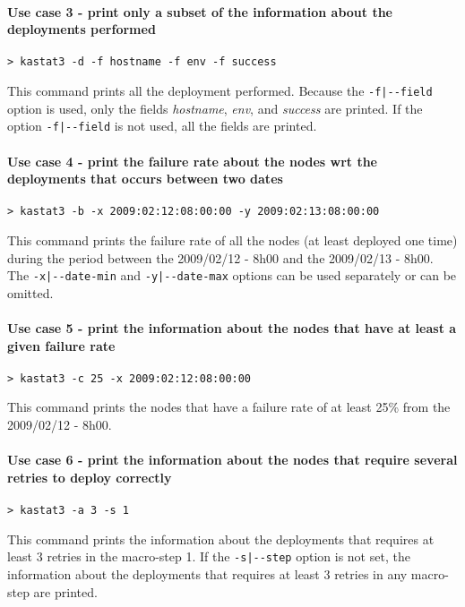 \documentclass[a4wide,10pt,oneside]{book}
\begin{document}
\paragraph{Use case 3 - print only a subset of the information about the deployments performed}
\begin{verbatim}
> kastat3 -d -f hostname -f env -f success
\end{verbatim}
This command prints all the deployment performed. Because the \texttt{-f|-{}-field} option is used, only the fields \textit{hostname}, \textit{env}, and \textit{success} are printed. If the option \texttt{-f|-{}-field} is not used, all the fields are printed.

\paragraph{Use case 4 - print the failure rate about the nodes wrt the deployments that occurs between two dates}
\begin{verbatim}
> kastat3 -b -x 2009:02:12:08:00:00 -y 2009:02:13:08:00:00
\end{verbatim}
This command prints the failure rate of all the nodes (at least deployed one time) during the period between the 2009/02/12 - 8h00 and the 2009/02/13 - 8h00. The \texttt{-x|-{}-date-min} and \texttt{-y|-{}-date-max} options can be used separately or can be omitted.

\paragraph{Use case 5 - print the information about the nodes that have at least a given failure rate}
\begin{verbatim}
> kastat3 -c 25 -x 2009:02:12:08:00:00
\end{verbatim}
This command prints the nodes that have a failure rate of at least 25\% from the 2009/02/12 - 8h00.

\paragraph{Use case 6 - print the information about the nodes that require several retries to deploy correctly}
\begin{verbatim}
> kastat3 -a 3 -s 1
\end{verbatim}
This command prints the information about the deployments that requires at least 3 retries in the macro-step 1. If the \texttt{-s|-{}-step} option is not set, the information about the deployments that requires at least 3 retries in any macro-step are printed.
\end{document}
